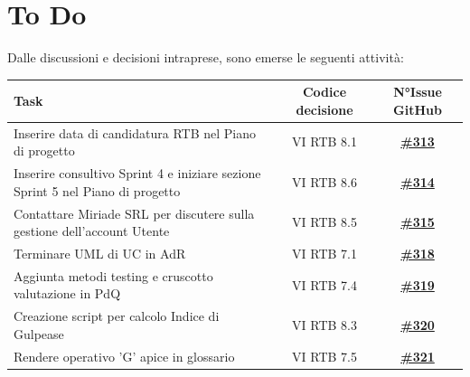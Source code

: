 \documentclass[a4paper,12pt]{article}
\newcommand{\ignoreglossary}{}
\begin{document}
\section{To Do}
Dalle discussioni e decisioni intraprese, sono emerse le seguenti attività:
\begin{center}
\small
\renewcommand{\arraystretch}{1.2} 
\begin{tabular}{|p{}|c|c|}
\hline
\rowcolor{gray!60} 
\textbf{Task} & \textbf{Codice decisione} & \textbf{N°Issue GitHub} \\
\hline
\rowcolor{white}
Inserire data di candidatura RTB nel Piano di progetto & VI \ignoreglossary{RTB} 8.1 & \href{https://github.com/SWE-BitByBit/SWE-docs/issues/313}{\textbf{\#313}} \\
\hline
\rowcolor{gray!20}
Inserire consultivo Sprint 4 e iniziare sezione Sprint 5 nel Piano di progetto & VI \ignoreglossary{RTB} 8.6 & \href{https://github.com/SWE-BitByBit/SWE-docs/issues/314}{\textbf{\#314}} \\
\hline
\rowcolor{white}
Contattare Miriade SRL per discutere sulla gestione dell'account Utente & VI \ignoreglossary{RTB} 8.5 & \href{https://github.com/SWE-BitByBit/SWE-docs/issues/315}{\textbf{\#315}} \\
\hline
\rowcolor{gray!20}
Terminare UML di UC in AdR & VI \ignoreglossary{RTB} 7.1 & \href{https://github.com/SWE-BitByBit/SWE-docs/issues/318}{\textbf{\#318}} \\
\hline
\rowcolor{white}
Aggiunta metodi testing e cruscotto valutazione in PdQ & VI \ignoreglossary{RTB} 7.4 & \href{https://github.com/SWE-BitByBit/SWE-docs/issues/319}{\textbf{\#319}} \\
\hline
\rowcolor{gray!20}
Creazione script per calcolo Indice di Gulpease & VI \ignoreglossary{RTB} 8.3 & \href{https://github.com/SWE-BitByBit/SWE-docs/issues/320}{\textbf{\#320}} \\
\hline
\rowcolor{white}
Rendere operativo 'G' apice in glossario & VI \ignoreglossary{RTB} 7.5 & \href{https://github.com/SWE-BitByBit/SWE-docs/issues/321}{\textbf{\#321}} \\
\hline
\end{tabular}
\end{center}
\end{document}
